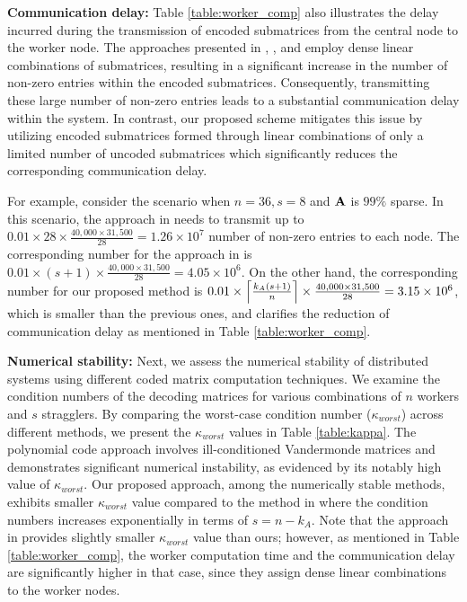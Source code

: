 \vspace{0.04 in}

{\bf Communication delay:} Table \ref{table:worker_comp} also illustrates the delay incurred during the transmission of encoded submatrices from the central node to the worker node. The approaches presented in \cite{yu2017polynomial}, \cite{8849468}, and \cite{8919859} employ dense linear combinations of submatrices, resulting in a significant increase in the number of non-zero entries within the encoded submatrices. Consequently, transmitting these large number of non-zero entries leads to a substantial communication delay within the system. In contrast, our proposed scheme mitigates this issue by utilizing encoded submatrices formed through linear combinations of only a limited number of uncoded submatrices which significantly reduces the corresponding communication delay.

For example, consider the scenario when $n = 36, s = 8$ and $\mathbf{A}$ is $99\%$ sparse. In this scenario, the approach in \cite{yu2017polynomial} needs to transmit up to $0.01 \times 28 \times \frac{40,000 \times 31,500}{28} = 1.26 \times 10^7$ number of non-zero entries to each node. The corresponding number for the approach in \cite{das2023jsait_submitted, das2023distributedisit} is $0.01 \times (s+1) \times \frac{40,000 \times 31,500}{28} = 4.05 \times 10^6$. On the other hand, the corresponding number for our proposed method is $0.01 \times \Bigl\lceil{\frac{k_A(s+1)}{n}}\Bigr\rceil \times \frac{40,000 \times 31,500}{28} = 3.15 \times 10^6$, which is smaller than the previous ones, and clarifies the reduction of communication delay as mentioned in Table \ref{table:worker_comp}.

\vspace{0.04 in}

{\bf Numerical stability:} 
Next, we assess the numerical stability of distributed systems using different coded matrix computation techniques. We examine the condition numbers of the decoding matrices for various combinations of $n$ workers and $s$ stragglers. By comparing the worst-case condition number ($\kappa_{worst}$) across different methods, we present the $\kappa_{worst}$ values in Table \ref{table:kappa}. The polynomial code approach \cite{yu2017polynomial} involves ill-conditioned Vandermonde matrices and demonstrates significant numerical instability, as evidenced by its notably high value of $\kappa_{worst}$. Our proposed approach, among the numerically stable methods, exhibits smaller $\kappa_{worst}$ value compared to the method in \cite{8849468} where the condition numbers increases exponentially in terms of $s = n - k_A$. Note that the approach in \cite{8919859} provides slightly smaller $\kappa_{worst}$ value than ours; however, as mentioned in Table \ref{table:worker_comp}, the worker computation time and the communication delay are significantly higher in that case, since they assign dense linear combinations to the worker nodes. 

